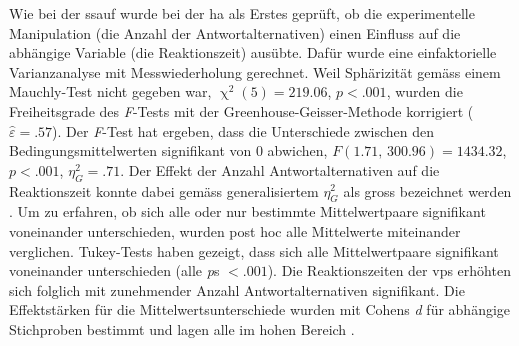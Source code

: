 \documentclass[11pt, twoside, a4paper]{book}		%
\begin{document}
Wie bei der \gls{ssauf} wurde bei der \gls{ha} als Erstes geprüft, ob die experimentelle Manipulation (die Anzahl der Antwortalternativen) einen Einfluss auf die abhängige Variable (die Reaktionszeit) ausübte. Dafür wurde 
eine einfaktorielle Varianzanalyse mit Messwiederholung gerechnet.
Weil Sphärizität gemäss einem Mauchly-Test nicht gegeben war, $\upchi^2(5)=219.06$, $p<.001$, wurden die Freiheitsgrade des \textit{F}-Tests mit der Greenhouse-Geisser-Methode korrigiert ($\hat{\varepsilon}=.57$). Der \textit{F}-Test hat ergeben, dass die Unterschiede zwischen den Bedingungsmittelwerten signifikant von 0 abwichen, $F(1.71,\,300.96)=1434.32$, $p<.001$, $\eta_{G}^2=.71$. Der Effekt der Anzahl Antwortalternativen auf die Reaktionszeit konnte dabei gemäss generalisiertem $\eta_{G}^2$ \citep{Olejnik2003} als gross bezeichnet werden \citep[S. 383]{Bakeman2005}.
Um zu erfahren, ob sich alle oder nur bestimmte Mittelwertpaare signifikant voneinander unterschieden, wurden post hoc alle Mittelwerte miteinander verglichen.
Tukey-Tests haben gezeigt, dass sich alle Mittelwertpaare signifikant voneinander unterschieden (alle \textit{p}s $<.001$).
Die Reaktionszeiten der \glspl{vp} erhöhten sich folglich mit zunehmender Anzahl Antwortalternativen signifikant.
Die Effektstärken für die Mittelwertsunterschiede wurden mit Cohens \textit{d} für abhängige Stichproben \citep{Gibbons1993} bestimmt und lagen alle im hohen Bereich \citep[][S. 40; siehe \autoref{tab:hick_effect_sizes}]{Cohen1988}.
\end{document}
